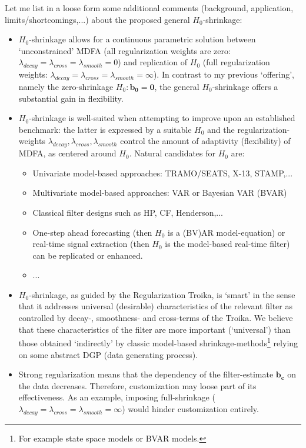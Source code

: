 \documentclass[11pt]{article}
\begin{document}
Let me list in a loose form some additional comments (background, application, limits/shortcomings,...) about the proposed general $H_0$-shrinkage:
\begin{itemize}
\item $H_0$-shrinkage allows for a continuous parametric solution between `unconstrained' MDFA (all regularization weights are zero: $\lambda_{decay}=\lambda_{cross}=\lambda_{smooth}=0$) and replication of $H_0$ (full regularization weights: $\lambda_{decay}=\lambda_{cross}=\lambda_{smooth}=\infty$). In contrast to my previous `offering', namely the zero-shrinkage $H_0: \mathbf{b_0=0}$, the general $H_0$-shrinkage offers a substantial gain in flexibility.
\item $H_0$-shrinkage is well-suited when attempting to improve upon an established benchmark: the latter is expressed by a suitable 
$H_0$ and the regularization-weights $\lambda_{decay},\lambda_{cross},\lambda_{smooth}$ control the amount of adaptivity (flexibility) of MDFA, as centered around $H_0$. Natural candidates for $H_0$ are:
\begin{itemize}
\item Univariate model-based approaches: TRAMO/SEATS, X-13, STAMP,...
\item Multivariate model-based approaches: VAR or Bayesian VAR (BVAR)
\item Classical filter designs such as HP, CF, Henderson,...
\item One-step ahead forecasting (then $H_0$ is a (BV)AR model-equation) or real-time signal extraction (then $H_0$ is the model-based 
real-time filter) can be replicated or enhanced.
\item ...
\end{itemize}
\item $H_0$-shrinkage, as guided by the Regularization Troika, is `smart' in the sense that it addresses universal (desirable) characteristics of the relevant filter as controlled by decay-, smoothness- and cross-terms of the Troika. We believe that these characteristics of the filter are more important (`universal') than those obtained `indirectly' by classic model-based shrinkage-methods\footnote{For example state space models or BVAR models.} relying on some abstract DGP (data generating process).
\item Strong regularization means that the dependency of the filter-estimate $\mathbf{b_c}$ on the data decreases.  Therefore, customization may loose part of its effectiveness. As an example, imposing full-shrinkage ($\lambda_{decay}=\lambda_{cross}=\lambda_{smooth}=\infty$) would hinder customization entirely.

\end{itemize}
\end{document}
